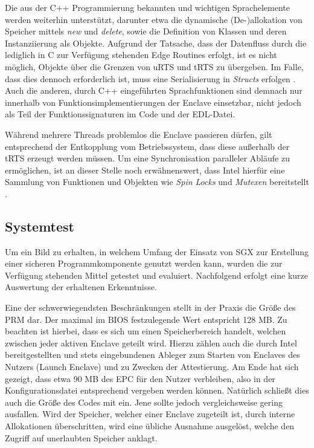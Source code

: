 Die aus der C++ Programmierung bekannten und wichtigen Sprachelemente werden weiterhin unterstützt, darunter etwa die dynamische (De-)allokation von Speicher mittels \textit{new} und \textit{delete}, sowie die Definition von Klassen und deren Instanziierung als Objekte. Aufgrund der Tatsache, dass der Datenfluss durch die lediglich in C zur Verfügung stehenden Edge Routines erfolgt, ist es nicht möglich, Objekte über die Grenzen von \ac{uRTS} und \ac{tRTS} zu übergeben. Im Falle, dass dies dennoch erforderlich ist, muss eine Serialisierung in \textit{Structs} erfolgen \cite{LinuxGuide}. Auch die anderen, durch C++ eingeführten Sprachfunktionen sind demnach nur innerhalb von Funktionsimplementierungen der Enclave einsetzbar, nicht jedoch als Teil der Funktionssignaturen im Code und der \ac{EDL}-Datei.

Während mehrere Threads problemlos die Enclave passieren dürfen, gilt entsprechend der Entkopplung vom Betriebssystem, dass diese außerhalb der \ac{tRTS} erzeugt werden müssen. Um eine Synchronisation paralleler Abläufe zu ermöglichen, ist an dieser Stelle noch erwähnenswert, dass Intel hierfür eine Sammlung von Funktionen und Objekten wie \textit{Spin Locks} und \textit{Mutexen} bereitstellt \cite{LinuxGuide}.

\subsection{Systemtest}

Um ein Bild zu erhalten, in welchem Umfang der Einsatz von \ac{SGX} zur Erstellung einer sicheren Programmkomponente genutzt werden kann, wurden die zur Verfügung stehenden Mittel getestet und evaluiert. Nachfolgend erfolgt eine kurze Auswertung der erhaltenen Erkenntnisse.

Eine der schwerwiegendsten Beschränkungen stellt in der Praxis die Größe des \ac{PRM} dar. Der maximal im \ac{BIOS} festzulegende Wert entspricht 128 MB. Zu beachten ist hierbei, dass es sich um einen Speicherbereich handelt, welchen zwischen jeder aktiven Enclave geteilt wird. Hierzu zählen auch die durch Intel bereitgestellten und stets eingebundenen Ableger zum Starten von Enclaves des Nutzers (Launch Enclave) und zu Zwecken der Attestierung. Am Ende hat sich gezeigt, dass etwa 90 MB des \ac{EPC} für den Nutzer verbleiben, also in der Konfigurationsdatei entsprechend vergeben werden können. Natürlich schließt dies auch die Größe des Codes mit ein. Jene sollte jedoch vergleichsweise gering ausfallen. Wird der Speicher, welcher einer Enclave zugeteilt ist, durch interne Allokationen überschritten, wird eine übliche Ausnahme ausgelöst, welche den Zugriff auf unerlaubten Speicher anklagt.

